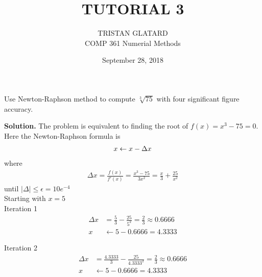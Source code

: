  

 

\title{TUTORIAL 3}%
\author{TRISTAN GLATARD\\ %
COMP 361 Numerial Methods} %
\date{September 28, 2018} 
\maketitle

\begin{exercise}{1} %
Use Newton-Raphson method to compute $\sqrt[3]{75}$ with four significant figure accuracy.

\textbf{Solution.} The problem is equivalent to finding the root of $f(x) = x^3-75 = 0$. Here the Newton-Raphson formula is\\
\begin{align}
\notag
x \leftarrow x - \Delta x  
\end{align}
where
\begin{align}
\Delta x = \frac{f(x)}{f\prime(x)} = \frac{x^3-75}{3x^2} = \frac{x}{3} + \frac{25}{x^2}
\end{align}
until $|\Delta| \leq \epsilon = 10e^{-4}$\\
Starting with $x=5$\\

Iteration 1
\begin{align}
\Delta x &= \frac{5}{3} - \frac{25}{5^2} = \frac{2}{3} \approx 0.6666\\
x &\leftarrow 5 - 0.6666 = 4.3333   
\end{align}

Iteration 2
\begin{align}
\Delta x &= \frac{4.3333}{3} - \frac{25}{4.3333^2} = \frac{2}{3} \approx 0.6666\\
x &\leftarrow 5 - 0.6666 = 4.3333   
\end{align}
\end{exercise}

